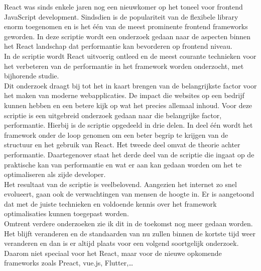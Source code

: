 React was sinds enkele jaren nog een nieuwkomer op het toneel voor frontend JavaScript development. Sindsdien is de populariteit van de flexibele library enorm toegenomen en is het één van de meest prominente frontend frameworks geworden. In deze scriptie wordt een onderzoek gedaan naar de aspecten binnen het React landschap dat performantie kan bevorderen op frontend niveau.\\
In de scriptie wordt React uitvoerig ontleed en de meest courante technieken voor het verbeteren van de performantie in het framework worden onderzocht, met bijhorende studie.\\
Dit onderzoek draagt bij tot het in kaart brengen van de belangrijkste factor voor het maken van moderne webapplicaties. De impact die websites op een bedrijf kunnen hebben en een betere kijk op wat het precies allemaal inhoud. Voor deze scriptie is een uitgebreid onderzoek gedaan naar die belangrijke factor, performantie. Hierbij is de scriptie opgedeeld in drie delen. In deel één wordt het framework onder de loop genomen om een beter begrip te krijgen van de structuur en het gebruik van React. Het tweede deel omvat de theorie achter performantie. Daartegenover staat het derde deel van de scriptie die ingaat op de praktische kan van performantie en wat er aan kan gedaan worden om het te optimaliseren als zijde developer.\\
Het resultaat van de scriptie is veelbelovend. Aangezien het internet zo snel evolueert, gaan ook de verwachtingen van  mensen de hoogte in. Er is aangetoond dat met de juiste technieken en voldoende kennis over het framework optimalisaties kunnen toegepast worden.\\
Omtrent verdere onderzoeken zie ik dit in de toekomst nog meer gedaan worden. Het blijft veranderen en de standaarden van nu zullen binnen de kortste tijd weer veranderen en dan is er altijd plaats voor een volgend soortgelijk onderzoek. Daarom niet speciaal voor het React, maar voor de nieuwe opkomende frameworks zoals Preact, vue.js, Flutter,\dots
